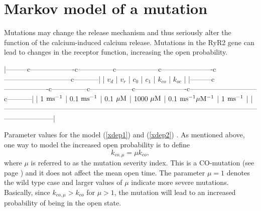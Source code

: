 \section{Markov model of a mutation}
\label{markovmodmutation}
Mutations may change the release mechanism and thus seriously alter the
function of the calcium-induced calcium release. Mutations in the RyR2
gene can lead to changes in the receptor function, increasing the open
probability. 

|---------c-------------------c---------------c------------------c----------------------c-----------------------------c-----------|
| $v_d$            | $v_r$              | $c_0$            | $c_1$             | $k_{co}$                      | $k_{oc}$         |
|---------c-------------------c---------------c------------------c----------------------c-----------------------------c-----------|
| 1 $\rm{ms^{-1}}$ | 0.1 $\rm{ms^{-1}}$ | 0.1 $\rm{\mu M}$ | 1000 $\rm{\mu M}$ | 0.1 $\rm{ms^{-1} \mu M^{-1}}$ | 1 $\rm{ms^{-1}}$ |
|---------------------------------------------------------------------------------------------------------------------------------|


Parameter values for the model (\ref{xdep1}) and (\ref{xdep2}) .%
As mentioned above, one way to model the increased open probability
is to define
\begin{equation}
k_{co,\mu}=\mu k_{co}, \label{severity}
\end{equation}
where $\mu$ is referred to as the mutation severity index. This is a
CO-mutation (see page \pageref{com}) and it does not affect the mean open
time. The parameter $\mu=1$ denotes the wild type case and larger values of
$\mu$ indicate more severe mutations. Basically, since $k_{co,\mu}>k_{co} $
for $\mu>1$, the mutation will lead to an increased probability of being in the
open state.

